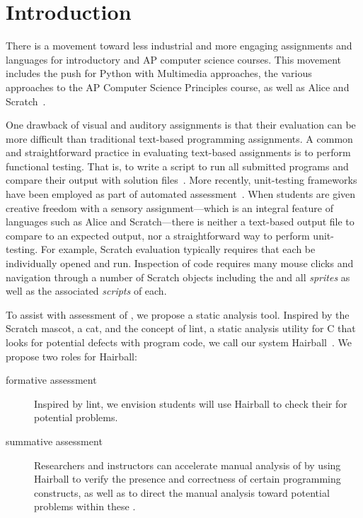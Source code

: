 \section{Introduction}
There is a movement toward less industrial and more engaging assignments and
languages for introductory and AP computer science courses.  This movement
includes the push for Python with Multimedia approaches, the various approaches
to the AP Computer Science Principles course, as well as Alice and
Scratch~\cite{Adams:2012:SLP:2157136.2157319, Forte:2004:CCC:962752.962945,
  Simon:2010:ERC:1822090.1822151, Snyder:2012:FFC:2189835.2189852,
  Cooper:2003:TOI:611892.611966, Maloney:2010:SPL:1868358.1868363}.

One drawback of visual and auditory assignments is that their evaluation can be
more difficult than traditional text-based programming assignments.  A common
and straightforward practice in evaluating text-based assignments is to perform
functional testing. That is, to write a script to run all submitted programs
and compare their output with solution
files~\cite{Jackson:1997:GSP:268084.268210}.  More recently, unit-testing
frameworks have been employed as part of automated
assessment~\cite{Spacco:2006:EMD:1140124.1140131,
  Edwards:2003:RCS:949344.949390}.  When students are given creative freedom
with a sensory assignment---which is an integral feature of languages such as
Alice and Scratch---there is neither a text-based output file to compare to an
expected output, nor a straightforward way to perform unit-testing.  For
example, Scratch evaluation typically requires that each \sprogram{} be
individually opened and run.  Inspection of \sprogram{} code requires many
mouse clicks and navigation through a number of Scratch objects including the
\stage{} and all \emph{sprites} as well as the associated \emph{scripts} of
each.

To assist with assessment of , we propose a static analysis tool.
Inspired by the Scratch mascot, a cat, and the concept of lint, a static
analysis utility for C that looks for potential defects with program code, we
call our system Hairball~\cite{Johnson78lint}. We propose two roles for
Hairball:

\begin{description}
\item[formative assessment] Inspired by lint, we envision students will use
  Hairball to check their  for potential problems.
\item[summative assessment] Researchers and instructors can accelerate manual
  analysis of  by using Hairball to verify the presence and
  correctness of certain programming constructs, as well as to direct the
  manual analysis toward potential problems within these .
\end{description}

